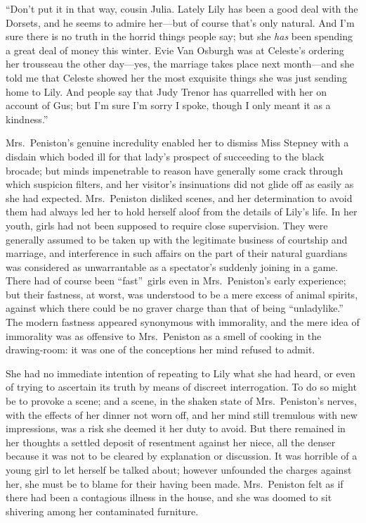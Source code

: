 \documentclass[12pt,a4paper]{book}
\begin{document}
``Don't put it in that way, cousin Julia. Lately Lily has been a
good deal with the Dorsets, and he seems to admire her---but of
course that's only natural. And I'm sure there is no truth in the
horrid things people say; but she \textit{has} been spending a great deal
of money this winter. Evie Van Osburgh was at Celeste's
ordering her trousseau the other day---yes, the marriage takes
place next month---and she told me that Celeste showed her the
most exquisite things she was just sending home to Lily. And
people say that Judy Trenor has quarrelled with her on account of
Gus; but I'm sure I'm sorry I spoke, though I only meant it as a
kindness.''





Mrs.\ Peniston's genuine incredulity enabled her to dismiss Miss
Stepney with a disdain which boded ill for that lady's prospect
of succeeding to the black brocade; but minds impenetrable to
reason have generally some crack through which suspicion filters,
and her visitor's insinuations did not glide off as easily as she
had expected. Mrs.\ Peniston disliked scenes, and her
determination to avoid them had always led her to hold herself
aloof from the details of Lily's life. In her youth, girls had
not been supposed to require close supervision. They were
generally assumed to be taken up with the legitimate business of
courtship and marriage, and interference in such affairs on the
part of their natural guardians was considered as unwarrantable
as a spectator's suddenly joining in a game. There had of course
been ``fast''\ girls even in Mrs.\ Peniston's early experience; but
their fastness, at worst, was understood to be a mere excess of
animal spirits, against which there could be no graver charge
than that of being ``unladylike.'' The modern fastness appeared
synonymous with immorality, and the mere idea of immorality was
as offensive to Mrs.\ Peniston as a smell of cooking in the
drawing-room: it was one of the conceptions her mind refused to
admit.





She had no immediate intention of repeating to Lily what she had
heard, or even of trying to ascertain its truth by means of
discreet interrogation. To do so might be to provoke a scene; and
a scene, in the shaken state of Mrs.\ Peniston's nerves, with the
effects of her dinner not worn off, and her mind still tremulous
with new impressions, was a risk she deemed it her duty to avoid. 
But there remained in her thoughts a settled deposit of
resentment against her niece, all the denser because it was not
to be cleared by explanation or discussion. It was horrible of a
young girl to let herself be talked about; however unfounded the
charges against her, she must be to blame for their
having been made. Mrs.\ Peniston felt as if there had been a
contagious illness in the house, and she was doomed to sit
shivering among her contaminated furniture.
\end{document}
